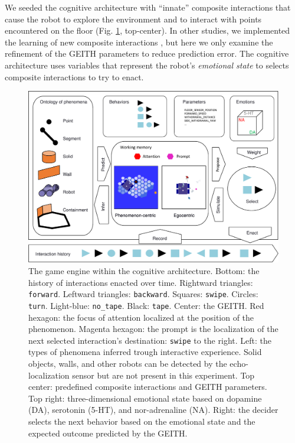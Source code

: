 \documentclass[runningheads]{llncs}
\begin{document}
We seeded the cognitive architecture with ``innate'' composite interactions that cause the robot to explore the environment and to interact with points encountered on the floor (Fig. \ref{fig:geith}, top-center). 
In other studies, we implemented the learning of new composite interactions \cite{georgeon_cash_2019}, but here we only examine the refinement of the GEITH parameters to reduce prediction error.
The cognitive architecture uses variables that represent the robot's \textit{emotional state} to selects composite interactions to try to enact.

\begin{figure}
	\includegraphics[width=\textwidth]{Figure_geith.pdf}
	\caption{The game engine within the cognitive architecture.
		Bottom: the history of interactions enacted over time.
		Rightward triangles: \texttt{forward}. Leftward triangles: \texttt{backward}. Squares: \texttt{swipe}. Circles: \texttt{turn}. Light-blue: \texttt{no\_tape}. Black: \texttt{tape}.
		Center: the GEITH.
		Red hexagon: the focus of attention localized at the position of the phenomenon. 
		Magenta hexagon: the prompt is the localization of the next selected interaction's destination: \texttt{swipe} to the right.
		Left: the types of phenomena inferred trough interactive experience.
		Solid objects, walls, and other robots can be detected by the echo-localization sensor but are not present in this experiment.
		Top center: predefined composite interactions and GEITH parameters.
		Top right: three-dimensional emotional state based on dopamine (DA), serotonin (5-HT), and nor-adrenaline (NA).
		Right: the decider selects the next behavior based on the emotional state and the expected outcome predicted by the GEITH.} \label{fig:geith}
\end{figure}
\end{document}
